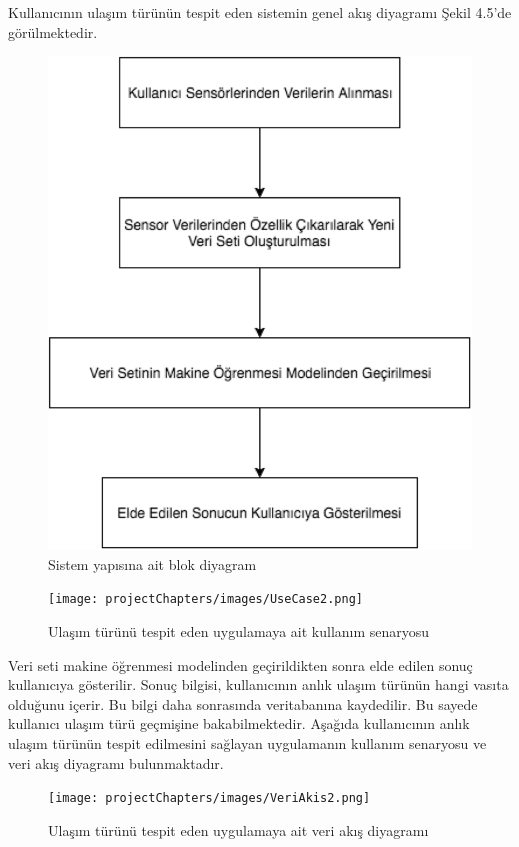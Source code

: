 Kullanıcının ulaşım türünün tespit eden sistemin genel akış diyagramı Şekil 4.5'de görülmektedir.

\begin{figure}[!htbp]
\centering
\includegraphics[scale=0.8]{projectChapters/images/yazilimTasarimi.png}
\caption{Sistem yapısına ait blok diyagram}
\end{figure}
\newpage
\begin{figure}[!htbp]
\centering
\texttt{[image: projectChapters/images/UseCase2.png]}
\caption{Ulaşım türünü tespit eden uygulamaya ait kullanım senaryosu}
\end{figure}

Veri seti makine öğrenmesi modelinden geçirildikten sonra elde edilen sonuç kullanıcıya gösterilir. Sonuç bilgisi, kullanıcının anlık ulaşım türünün hangi vasıta olduğunu içerir. Bu bilgi daha sonrasında veritabanına kaydedilir. Bu sayede kullanıcı ulaşım türü geçmişine bakabilmektedir. Aşağıda kullanıcının anlık ulaşım türünün tespit edilmesini sağlayan uygulamanın kullanım senaryosu ve veri akış diyagramı bulunmaktadır.

\begin{figure}[!htbp]
\centering
\texttt{[image: projectChapters/images/VeriAkis2.png]}
\caption{Ulaşım türünü tespit eden uygulamaya ait veri akış diyagramı}
\end{figure}